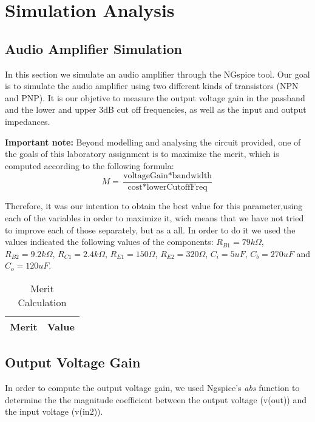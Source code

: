 \section{Simulation Analysis}
\label{sec:simulation}

\subsection{Audio Amplifier Simulation}
\label{subsec:amp_simulation}
\par In this section we simulate an audio amplifier through the NGspice tool. Our goal is to simulate the audio amplifier using two different kinds of transistors (NPN and PNP). It is our objetive to measure the output voltage gain in the passband and the lower and upper 3dB cut off frequencies, as well as the input and output impedances.

\par  \textbf{Important note:} Beyond modelling and analysing the circuit provided, one of the goals of this laboratory assignment is to maximize the merit, which is computed according to the following formula:
\begin{equation}
M = \frac{\text{voltageGain}*\text{bandwidth}}{\text{cost}*\text{lowerCutoffFreq}}
\end{equation}

Therefore, it was our intention to obtain the best value for this parameter,using each of the variables in order to maximize it, wich means that we have not tried to improve each of those separately, but as a all.
In order to do it we used the values indicated the following values of the components: $R_{B1}=79k\Omega$, $R_{B2}=9.2k\Omega$, $R_{C1}=2.4k\Omega$, $R_{E1}=150\Omega$, $R_{E2}=320\Omega$, $C_{i}=5uF$, $C_{b}=270uF$ and $C_{o}=120uF$.   
  

\begin{table}[H]
  \centering
  \begin{tabular}{ |l|r| } 
    \hline    
    {\bf Merit} & {\bf Value} \\ \hline
    
  \end{tabular}
  \caption{Merit Calculation}
  \label{tab:merit}
\end{table}

\subsection{Output Voltage Gain}
\label{output_gain}
\par In order to compute the output voltage gain, we used Ngspice's \textit{abs} function to determine the the magnitude coefficient between the output voltage (v(out)) and the input voltage (v(in2)).

